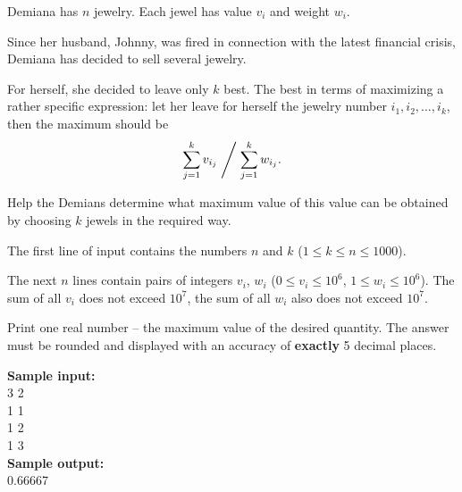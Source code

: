 \documentclass[a4paper]{article}
\begin{document}
Demiana has $n$ jewelry. Each jewel has value $v_i$ and weight $w_i$.

Since her husband, Johnny, was fired in connection with the latest financial crisis, Demiana has decided to sell several jewelry.

For herself, she decided to leave only $k$ best. The best in terms of maximizing a rather specific expression: let her leave for herself the jewelry number $i_1, i_2, \ldots, i_k$, then the maximum should be
\[
	\sum\limits_{j=1}^{k} v_{i_j} \Biggm/ \sum\limits_{j=1}^{k} w_{i_j}.
\]

Help the Demians determine what maximum value of this value can be obtained by choosing $k$ jewels in the required way.

The first line of input contains the numbers $n$ and $k$ ($1 \le k \le n \le 1000$).

The next $n$ lines contain pairs of integers $v_i$, $w_i$ ($0 \le v_i \le 10^6$, $1 \le w_i \le 10^6$). The sum of all $v_i$ does not exceed $10^7$, the sum of all $w_i$ also does not exceed $10^7$.

Print one real number -- the maximum value of the desired quantity. The answer must be rounded and displayed with an accuracy of \textbf{exactly} 5 decimal places.

\LINE

\noindent \textbf{Sample input:}\\
3 2\\
1 1\\
1 2\\
1 3\\


\noindent \textbf{Sample output:}\\
0.66667
\end{document}

